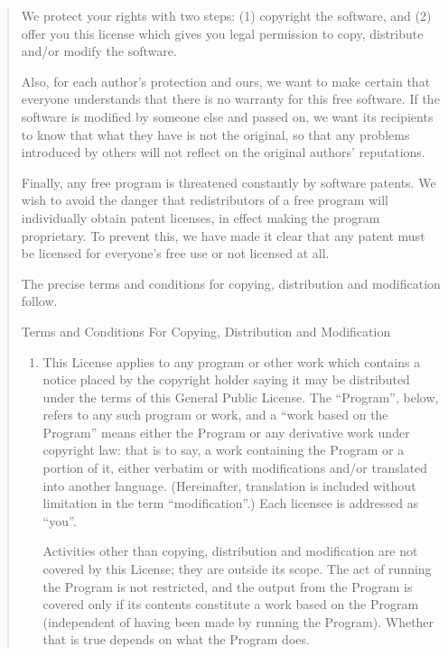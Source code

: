 \documentclass[twoside,11pt]{article}
\renewcommand{\_}{\texttt{\symbol{95}}}
\begin{document}
\begin{quote}
We protect your rights with two steps: (1) copyright the software, and (2)
offer you this license which gives you legal permission to copy,
distribute and/or modify the software.

Also, for each author's protection and ours, we want to make certain that
everyone understands that there is no warranty for this free software.  If
the software is modified by someone else and passed on, we want its
recipients to know that what they have is not the original, so that any
problems introduced by others will not reflect on the original authors'
reputations.

Finally, any free program is threatened constantly by software patents.
We wish to avoid the danger that redistributors of a free program will
individually obtain patent licenses, in effect making the program
proprietary.  To prevent this, we have made it clear that any patent must
be licensed for everyone's free use or not licensed at all.

The precise terms and conditions for copying, distribution and
modification follow.

\begin{center}
{\Large \sc Terms and Conditions For Copying, Distribution and
  Modification}
\end{center}

\begin{enumerate}

\addtocounter{enumi}{-1}

\item 

This License applies to any program or other work which contains a notice
placed by the copyright holder saying it may be distributed under the
terms of this General Public License.  The ``Program'', below, refers to
any such program or work, and a ``work based on the Program'' means either
the Program or any derivative work under copyright law: that is to say, a
work containing the Program or a portion of it, either verbatim or with
modifications and/or translated into another language.  (Hereinafter,
translation is included without limitation in the term ``modification''.)
Each licensee is addressed as ``you''.

Activities other than copying, distribution and modification are not
covered by this License; they are outside its scope.  The act of
running the Program is not restricted, and the output from the Program
is covered only if its contents constitute a work based on the
Program (independent of having been made by running the Program).
Whether that is true depends on what the Program does.


\end{enumerate}
\end{quote}
\end{document}
